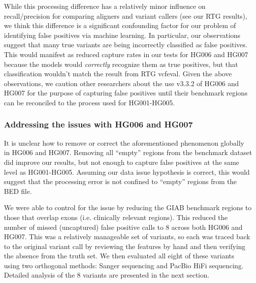 While this processing difference has a relatively minor influence on recall/precision for comparing aligners and variant callers (see our RTG results), 
we think this difference is a significant confounding factor for our problem of identifying false positives via machine learning.
In particular, our observations suggest that many true variants are being incorrectly classified as false positives.
This would manifest as reduced capture rates in our tests for HG006 and HG007 because the models would \textit{correctly} recognize them as true positives, but that classification wouldn't match the result from RTG vcfeval.
Given the above observations, we caution other researchers about the use v3.3.2 of HG006 and HG007 for the purpose of capturing false positives until their benchmark regions can be reconciled to the process used for HG001-HG005.

\subsubsection{Addressing the issues with HG006 and HG007}
It is unclear how to remove or correct the aforementioned phenomenon globally in HG006 and HG007.
Removing all ``empty'' regions from the benchmark dataset did improve our results, but not enough to capture false positives at the same level as HG001-HG005.
Assuming our data issue hypothesis is correct, this would suggest that the processing error is not confined to ``empty'' regions from the BED file.

We were able to control for the issue by reducing the GIAB benchmark regions to those that overlap exons (i.e. clinically relevant regions).
This reduced the number of missed (uncaptured) false positive calls to 8 across both HG006 and HG007.
This was a relatively manageable set of variants, so each was traced back to the original variant call by reviewing the features by hand and then verifying the absence from the truth set.
We then evaluated all eight of these variants using two orthogonal methods: Sanger sequencing and PacBio HiFi sequencing.
Detailed analysis of the 8 variants are presented in the next section.

